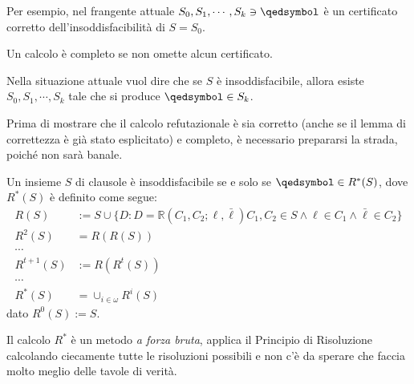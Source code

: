 Per esempio, nel frangente attuale 
$S_0, S_1, \cdots, S_k \ni \qedsymbol$ è un certificato 
corretto dell'insoddisfacibilità di $S = S_0$. 

\begin{defi}[Completezza]
        Un calcolo è completo se non omette alcun certificato. 
\end{defi}
Nella situazione attuale vuol dire che se $S$ è insoddisfacibile, allora 
esiste $S_0, S_1, \cdots, S_k$ tale che si produce $\qedsymbol \in S_k$.


Prima di mostrare che il calcolo refutazionale è sia corretto (anche se 
il lemma di correttezza è già stato esplicitato) e completo, è necessario 
prepararsi la strada, poiché non sarà banale. 

\begin{teo}
       Un insieme $S$ di clausole è insoddisfacibile se e solo se 
       $\qedsymbol \in R^*(S)$, dove $R^*(S)$ è definito come segue: 
       \begin{align*}
               R(S) &:= S \cup \{D: D = \mathbb{R}(C_1, C_2; \ell, \bar{\ell}) C_1, C_2 \in S \land \ell \in C_1 \land \bar{\ell} \in C_2\} \\
               R^2(S) &= R(R(S)) \\
               \cdots \\
               R^{t+1}(S) &:= R(R^{t}(S)) \\
               \cdots \\
               R^*(S) &= \cup_{i \in \omega} R^i(S)
       \end{align*}
       dato $R^0(S) := S$. 
\end{teo}

Il calcolo $R^*$ è un metodo \textit{a forza bruta}, applica il 
Principio di Risoluzione calcolando ciecamente 
tutte le risoluzioni possibili e non c'è da sperare che faccia molto meglio 
delle tavole di verità. 

